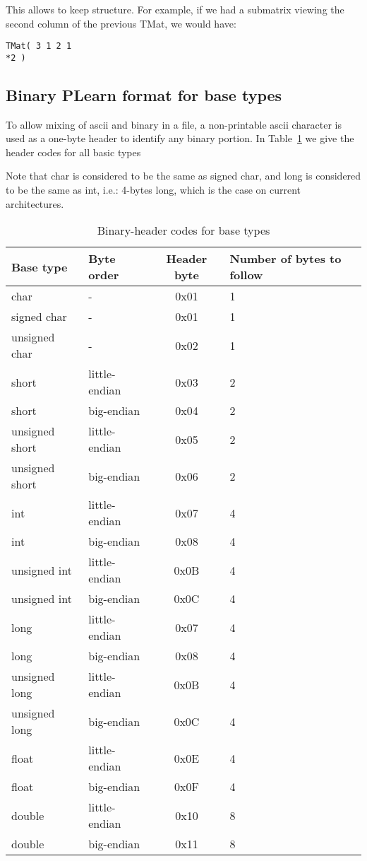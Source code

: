 \documentclass[11pt]{book}
\begin{document}
This allows to keep structure. For example, if we had a submatrix viewing
the second column of the previous TMat, we would have:

\begin{verbatim}
TMat( 3 1 2 1
*2 )
\end{verbatim}

\subsection{Binary PLearn format for base types}

To allow mixing of ascii and binary in a file, a non-printable ascii
character is used as a one-byte header to identify any binary portion.  In
Table~\ref{tab:base-types} we give the header codes for all basic types

Note that char is considered to be the same as signed char, and long is
considered to be the same as int, i.e.: 4-bytes long, which is the case on
current architectures.

\begin{table}[h]
\caption{ Binary-header codes for base types }
\label{tab:base-types}
\begin{tabular}{|llcl|} \hline 
Base type      & Byte order    & Header byte & Number of bytes to follow \\ \hline 
char           & -             & 0x01        & 1 \\
signed char    & -             & 0x01        & 1 \\
unsigned char  & -             & 0x02        & 1 \\
short          & little-endian & 0x03        & 2 \\
short          & big-endian    & 0x04        & 2 \\
unsigned short & little-endian & 0x05        & 2 \\
unsigned short & big-endian    & 0x06        & 2 \\
int            & little-endian & 0x07        & 4 \\
int            & big-endian    & 0x08        & 4 \\
unsigned int   & little-endian & 0x0B        & 4 \\
unsigned int   & big-endian    & 0x0C        & 4 \\
long           & little-endian & 0x07        & 4 \\
long           & big-endian    & 0x08        & 4 \\
unsigned long  & little-endian & 0x0B        & 4 \\
unsigned long  & big-endian    & 0x0C        & 4 \\
float          & little-endian & 0x0E        & 4 \\
float          & big-endian    & 0x0F        & 4 \\
double         & little-endian & 0x10        & 8 \\
double         & big-endian    & 0x11        & 8 \\ \hline 
\end{tabular}
\begin{center}
\end{center}
\end{table}
\end{document}
